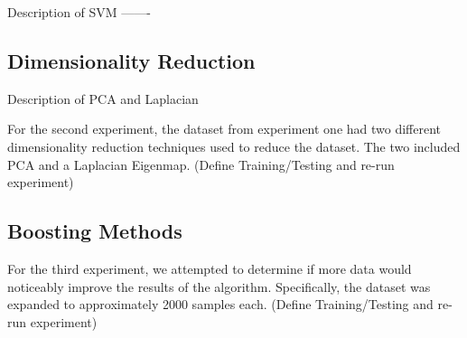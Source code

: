 


Description of SVM -------



\subsection{Dimensionality Reduction}

Description of PCA and Laplacian


For the second experiment, the dataset from experiment one had two different dimensionality reduction techniques used to reduce the dataset.  The two included PCA and a Laplacian Eigenmap.  (Define Training/Testing and re-run experiment)
\subsection{Boosting Methods}
For the third experiment, we attempted to determine if more data would noticeably improve the results of the algorithm.  Specifically, the dataset was expanded to approximately 2000 samples each. (Define Training/Testing and re-run experiment)